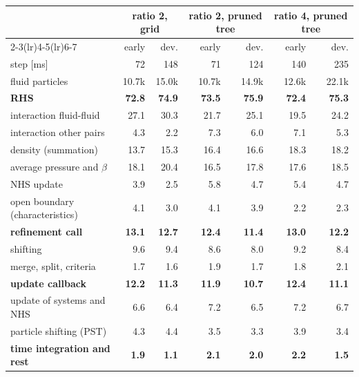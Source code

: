 \begin{tabular}{lrrrrrr}
\toprule
 & \multicolumn{2}{c}{ratio 2, grid} & \multicolumn{2}{c}{ratio 2, pruned tree} & \multicolumn{2}{c}{ratio 4, pruned tree} \\
\cmidrule(lr){2-3}\cmidrule(lr){4-5}\cmidrule(lr){6-7}
 & early & dev. & early & dev. & early & dev. \\
\midrule
step [ms] & 72 & 148 & 71 & 124 & 140 & 235 \\
fluid particles & 10.7k & 15.0k & 10.7k & 14.9k & 12.6k & 22.1k \\
\midrule
\textbf{RHS} & \textbf{72.8} & \textbf{74.9} & \textbf{73.5} & \textbf{75.9} & \textbf{72.4} & \textbf{75.3} \\
\quad interaction fluid-fluid & 27.1 & 30.3 & 21.7 & 25.1 & 19.5 & 24.2 \\
\quad interaction other pairs & 4.3 & 2.2 & 7.3 & 6.0 & 7.1 & 5.3 \\
\quad density (summation) & 13.7 & 15.3 & 16.4 & 16.6 & 18.3 & 18.2 \\
\quad average pressure and $\beta$ & 18.1 & 20.4 & 16.5 & 17.8 & 17.6 & 18.5 \\
\quad NHS update & 3.9 & 2.5 & 5.8 & 4.7 & 5.4 & 4.7 \\
\quad open boundary (characteristics) & 4.1 & 3.0 & 4.1 & 3.9 & 2.2 & 2.3 \\
\textbf{refinement call} & \textbf{13.1} & \textbf{12.7} & \textbf{12.4} & \textbf{11.4} & \textbf{13.0} & \textbf{12.2} \\
\quad shifting & 9.6 & 9.4 & 8.6 & 8.0 & 9.2 & 8.4 \\
\quad merge, split, criteria & 1.7 & 1.6 & 1.9 & 1.7 & 1.8 & 2.1 \\
\textbf{update callback} & \textbf{12.2} & \textbf{11.3} & \textbf{11.9} & \textbf{10.7} & \textbf{12.4} & \textbf{11.1} \\
\quad update of systems and NHS & 6.6 & 6.4 & 7.2 & 6.5 & 7.2 & 6.7 \\
\quad particle shifting (PST) & 4.3 & 4.4 & 3.5 & 3.3 & 3.9 & 3.4 \\
\textbf{time integration and rest} & \textbf{1.9} & \textbf{1.1} & \textbf{2.1} & \textbf{2.0} & \textbf{2.2} & \textbf{1.5} \\
\bottomrule
\end{tabular}
